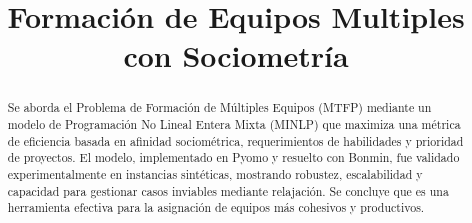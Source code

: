 \documentclass[conference]{IEEEtran}
\begin{document}
\title{Formación de Equipos Multiples con Sociometría}

\author{
}

\maketitle

\begin{abstract}
    Se aborda el Problema de Formación de Múltiples Equipos (MTFP) mediante un modelo de Programación No Lineal Entera Mixta (MINLP) que maximiza una métrica de eficiencia basada en afinidad sociométrica, requerimientos de habilidades y prioridad de proyectos. El modelo, implementado en Pyomo y resuelto con Bonmin, fue validado experimentalmente en instancias sintéticas, mostrando robustez, escalabilidad y capacidad para gestionar casos inviables mediante relajación. Se concluye que es una herramienta efectiva para la asignación de equipos más cohesivos y productivos.

\end{abstract}
\end{document}
